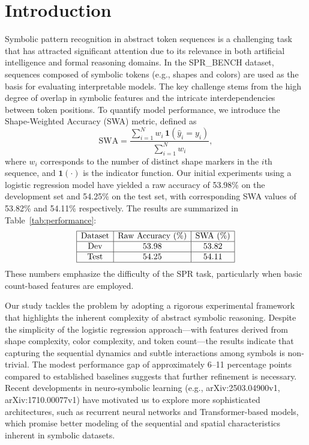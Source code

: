 \documentclass{article}
\begin{document}
\section{Introduction}
Symbolic pattern recognition in abstract token sequences is a challenging task that has attracted significant attention due to its relevance in both artificial intelligence and formal reasoning domains. In the SPR\_BENCH dataset, sequences composed of symbolic tokens (e.g., shapes and colors) are used as the basis for evaluating interpretable models. The key challenge stems from the high degree of overlap in symbolic features and the intricate interdependencies between token positions. To quantify model performance, we introduce the Shape-Weighted Accuracy (SWA) metric, defined as 
\[
\mathrm{SWA} = \frac{\sum_{i=1}^{N} w_i \, \mathbf{1}(\hat{y}_i = y_i)}{\sum_{i=1}^{N} w_i},
\]
where \(w_i\) corresponds to the number of distinct shape markers in the \(i\)th sequence, and \(\mathbf{1}(\cdot)\) is the indicator function. Our initial experiments using a logistic regression model have yielded a raw accuracy of 53.98\% on the development set and 54.25\% on the test set, with corresponding SWA values of 53.82\% and 54.11\% respectively. The results are summarized in Table~\ref{tab:performance}:
\[
\begin{array}{|c|c|c|}
\hline
\text{Dataset} & \text{Raw Accuracy (\%)} & \text{SWA (\%)} \\
\hline
\text{Dev} & 53.98 & 53.82 \\
\hline
\text{Test} & 54.25 & 54.11 \\
\hline
\end{array}
\]
These numbers emphasize the difficulty of the SPR task, particularly when basic count-based features are employed.

Our study tackles the problem by adopting a rigorous experimental framework that highlights the inherent complexity of abstract symbolic reasoning. Despite the simplicity of the logistic regression approach—with features derived from shape complexity, color complexity, and token count—the results indicate that capturing the sequential dynamics and subtle interactions among symbols is non-trivial. The modest performance gap of approximately 6–11 percentage points compared to established baselines suggests that further refinement is necessary. Recent developments in neuro-symbolic learning (e.g., arXiv:2503.04900v1, arXiv:1710.00077v1) have motivated us to explore more sophisticated architectures, such as recurrent neural networks and Transformer-based models, which promise better modeling of the sequential and spatial characteristics inherent in symbolic datasets.
\end{document}
